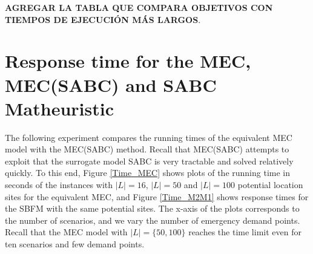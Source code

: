 \textbf{AGREGAR LA TABLA QUE COMPARA OBJETIVOS CON TIEMPOS DE EJECUCIÓN MÁS LARGOS}.




\section{Response time for the MEC, MEC(SABC) and SABC Matheuristic}
 The following experiment compares the running times of the equivalent MEC model with the MEC(SABC) method. Recall that MEC(SABC) attempts to exploit that the surrogate model SABC is very tractable and solved relatively quickly. To this end, Figure \ref{Time_MEC} shows plots of the running time in seconds of the instances with $|L|=16$, $|L|=50$ and $|L|=100$ potential location sites for the equivalent MEC, and Figure \ref{Time_M2M1} shows response times for the SBFM with the same potential sites. The x-axis of the plots corresponds to the number of scenarios, and we vary the number of emergency demand points. Recall that the MEC model with $|L|=\{50,100\}$ reaches the time limit even for ten scenarios and few demand points. 
 
